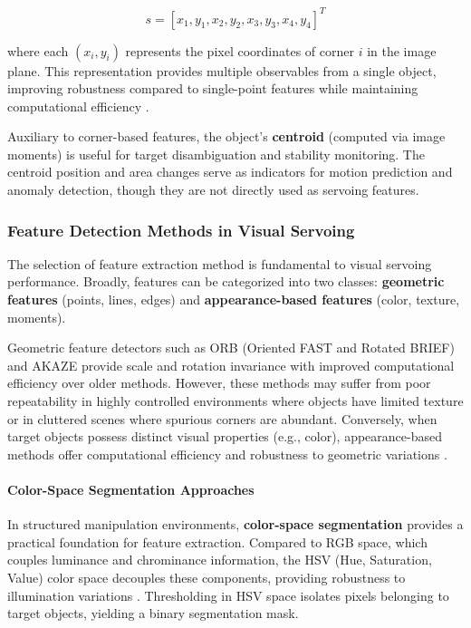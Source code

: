 \begin{equation}
    s = [x_{1}, y_{1}, x_{2}, y_{2}, x_{3}, y_{3}, x_{4}, y_{4}]^T
\end{equation}

where each $(x_i, y_i)$ represents the pixel coordinates of corner $i$ in the image plane. This representation provides multiple observables from a single object, improving robustness compared to single-point features while maintaining computational efficiency \cite{Chaumette2006}.

Auxiliary to corner-based features, the object's \textbf{centroid} (computed via image moments) is useful for target disambiguation and stability monitoring. The centroid position and area changes serve as indicators for motion prediction and anomaly detection, though they are not directly used as servoing features.

\subsubsection{Feature Detection Methods in Visual Servoing}
The selection of feature extraction method is fundamental to visual servoing performance. Broadly, features can be categorized into two classes: \textbf{geometric features} (points, lines, edges) and \textbf{appearance-based features} (color, texture, moments). 

Geometric feature detectors such as ORB (Oriented FAST and Rotated BRIEF) \cite{Rublee2011} and AKAZE \cite{Alcantarilla2012} provide scale and rotation invariance with improved computational efficiency over older methods. However, these methods may suffer from poor repeatability in highly controlled environments where objects have limited texture or in cluttered scenes where spurious corners are abundant. Conversely, when target objects possess distinct visual properties (e.g., color), appearance-based methods offer computational efficiency and robustness to geometric variations \cite{Chaumette2006}.

\paragraph{Color-Space Segmentation Approaches}
In structured manipulation environments, \textbf{color-space segmentation} provides a practical foundation for feature extraction. Compared to RGB space, which couples luminance and chrominance information, the HSV (Hue, Saturation, Value) color space decouples these components, providing robustness to illumination variations \cite{Fairchild2013}. Thresholding in HSV space isolates pixels belonging to target objects, yielding a binary segmentation mask.

